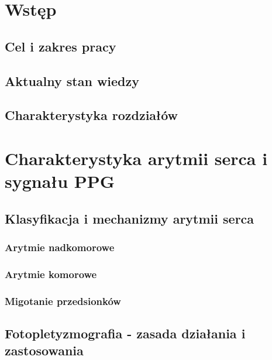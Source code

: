 \documentclass[a4paper,twoside,12pt]{book}
\newcounter{stronyPozaNumeracja}
\begin{document}
\tableofcontents

\setcounter{stronyPozaNumeracja}{\value{page}}
\mainmatter
\pagestyle{empty}

\cleardoublepage

\pagestyle{NumeryStronNazwyRozdzialow}


\chapter{Wstęp}
\section{Cel i zakres pracy}
\section{Aktualny stan wiedzy}
\section{Charakterystyka rozdziałów}


\chapter{Charakterystyka arytmii serca i sygnału PPG}
\section{Klasyfikacja i mechanizmy arytmii serca}
\subsection{Arytmie nadkomorowe}
\subsection{Arytmie komorowe}
\subsection{Migotanie przedsionków}
\section{Fotopletyzmografia - zasada działania i zastosowania}
\end{document}
